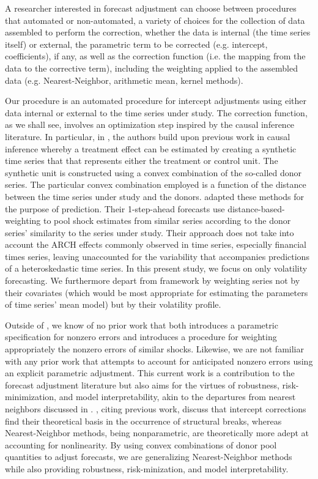 \documentclass[11pt]{article}
\theoremstyle{definition}
\begin{document}
A researcher interested in forecast adjustment can choose between procedures that automated or non-automated, a variety of choices for the collection of data assembled to perform the correction, whether the data is internal (the time series itself) or external, the parametric term to be corrected (e.g. intercept, coefficients), if any, as well as the correction function (i.e. the mapping from the data to the corrective term), including the weighting applied to the assembled data (e.g. Nearest-Neighbor, arithmetic mean, kernel methods).

Our procedure is an automated procedure for intercept adjustments using either data internal or external to the time series under study.  The correction function, as we shall see, involves an optimization step inspired by the causal inference literature.  In particular, in \citet{abadie2010synthetic}, the authors build upon previous work in causal inference whereby a treatment effect can be estimated by creating a synthetic time series that that represents either the treatment or control unit.  The synthetic unit is constructed using a convex combination of the so-called donor series.  The particular convex combination employed is a function of the distance between the time series under study and the donors.  \citet{lin2021minimizing} adapted these methods for the purpose of prediction.  Their 1-step-ahead forecasts use distance-based-weighting to pool shock estimates from similar series according to the donor series' similarity to the series under study.  Their approach does not take into account the ARCH effects commonly observed in time series, especially financial times series, leaving unaccounted for the variability that accompanies predictions of a heteroskedastic time series.  In this present study, we focus on only volatility forecasting.  We furthermore depart from \citet{lin2021minimizing} framework by weighting series not by their covariates (which would be most appropriate for estimating the parameters of time series' mean model) but by their volatility profile.  

Outside of \citet{lin2021minimizing}, we know of no prior work that both introduces a parametric specification for nonzero errors and introduces a procedure for weighting appropriately the nonzero errors of similar shocks.  Likewise, we are not familiar with any prior work that attempts to account for anticipated nonzero errors using an explicit parametric adjustment.  This current work is a contribution to the forecast adjustment literature but also aims for the virtues of robustness, risk-minimization, and model interpretability, akin to the departures from nearest neighbors discussed in \citet{abadie2021penalized}.  \citet{guerron2017macroeconomic}, citing previous work, discuss that intercept corrections find their theoretical basis in the occurrence of structural breaks, whereas Nearest-Neighbor methods, being nonparametric, are theoretically more adept at accounting for nonlinearity.  By using convex combinations of donor pool quantities to adjust forecasts, we are generalizing Nearest-Neighbor methods while also providing robustness, risk-minization, and model interpretability.
\end{document}
